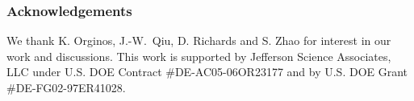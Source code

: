 \subsubsection*{Acknowledgements}
We thank K. Orginos, \mbox{J.-W. Qiu}, D. Richards and S. Zhao for
interest in our work and discussions. This work is supported by Jefferson Science Associates,
LLC under U.S. DOE Contract \#DE-AC05-06OR23177
and by U.S. DOE Grant \#DE-FG02-97ER41028.
